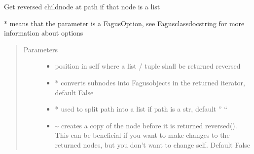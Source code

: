 \documentclass[a4paper,10pt,english]{sphinxmanual}
\begin{document}
\begin{fulllineitems}
\begin{fulllineitems}
\end{fulllineitems}


\begin{fulllineitems}
\label{\detokenize{fagus.fagus:fagus.fagus.Fagus.reversed}}
\pysigstartsignatures
{}
\pysigstopsignatures
\sphinxAtStartPar
Get reversed child\sphinxhyphen{}node at path if that node is a list

\sphinxAtStartPar
* means that the parameter is a FagusOption, see Fagus\sphinxhyphen{}class\sphinxhyphen{}docstring for more information about options
\begin{quote}\begin{description}
\item[{Parameters}] \leavevmode\begin{itemize}
\item {}
\sphinxAtStartPar
{} \textendash{} position in self where a list / tuple shall be returned reversed

\item {}
\sphinxAtStartPar
{} \textendash{} * converts sub\sphinxhyphen{}nodes into Fagus\sphinxhyphen{}objects in the returned iterator, default False

\item {}
\sphinxAtStartPar
{} \textendash{} * used to split path into a list if path is a str, default ” “

\item {}
\sphinxAtStartPar
{} \textendash{} \textasciitilde{} creates a copy of the node before it is returned reversed(). This can be beneficial if you want to
make changes to the returned nodes, but you don’t want to change self. Default False


\end{itemize}
\end{description}
\end{quote}
\end{fulllineitems}
\end{fulllineitems}
\end{document}
